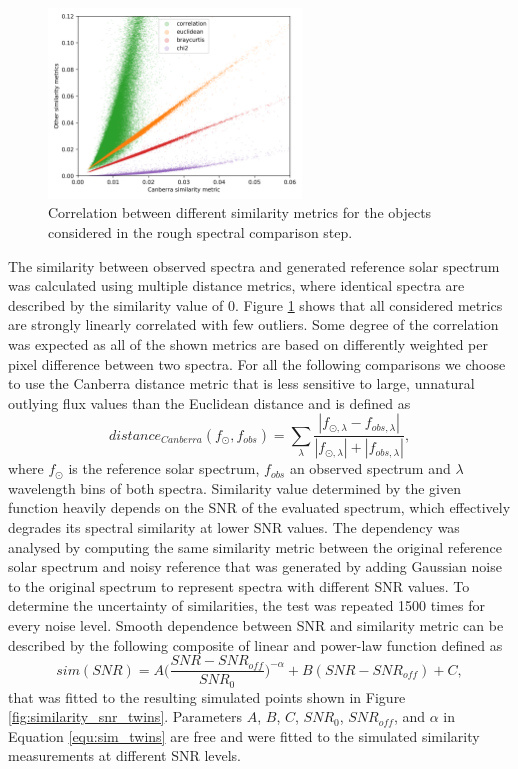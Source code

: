 \begin{figure}
	\centering
	\includegraphics[width=0.6\textwidth]{sim_combine_b2.png}
	\caption{Correlation between different similarity metrics for the objects considered in the rough spectral comparison step.}
	\label{fig:sim_combine_twins}
\end{figure}

The similarity between observed spectra and generated reference solar spectrum was calculated using multiple distance metrics, where identical spectra are described by the similarity value of 0. Figure \ref{fig:sim_combine_twins} shows that all considered metrics are strongly linearly correlated with few outliers. Some degree of the correlation was expected as all of the shown metrics are based on differently weighted per pixel difference between two spectra. For all the following comparisons we choose to use the Canberra distance metric \citep{Lance1967MixedDataCP} that is less sensitive to large, unnatural outlying flux values than the Euclidean distance and is defined as 
\begin{equation}
	\label{equ:equ_canberra}
	distance_{Canberra}(f_{\odot}, f_{obs}) = \sum_{\lambda}^{\ } \frac{|f_{\odot,\lambda} - f_{obs,\lambda}|}{|f_{\odot,\lambda}| + |f_{obs,\lambda}|},
\end{equation}
where $f_{\odot}$ is the reference solar spectrum, $f_{obs}$ an observed spectrum and $\lambda$ wavelength bins of both spectra. Similarity value determined by the given function heavily depends on the SNR of the evaluated spectrum, which effectively degrades its spectral similarity at lower SNR values. The dependency was analysed by computing the same similarity metric between the original reference solar spectrum and noisy reference that was generated by adding Gaussian noise to the original spectrum to represent spectra with different SNR values. To determine the uncertainty of similarities, the test was repeated 1500 times for every noise level. Smooth dependence between SNR and similarity metric can be described by the following composite of linear and power-law function defined as
\begin{equation}
	\label{equ:sim_twins}
	sim(SNR) = A \Big(\frac{SNR-SNR_{off}}{SNR_0}\Big)^{-\alpha} + B (SNR-SNR_{off}) + C,
\end{equation}
that was fitted to the resulting simulated points shown in Figure \ref{fig:similarity_snr_twins}. Parameters $A$, $B$, $C$, $SNR_0$, $SNR_{off}$, and $\alpha$ in Equation \ref{equ:sim_twins} are free and were fitted to the simulated similarity measurements at different SNR levels.

